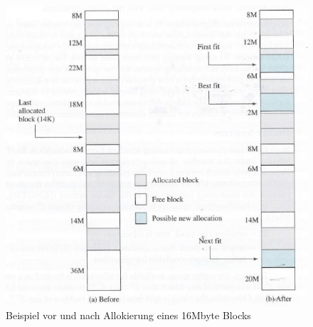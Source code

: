 \documentclass[a4paper]{scrreprt}
\begin{document}
\begin{figure}[ht]
\centering
\includegraphics[scale=0.55]{allocationexample.png}
\caption{Beispiel vor und nach Allokierung eines 16Mbyte Blocks}
\end{figure}
\end{document}
